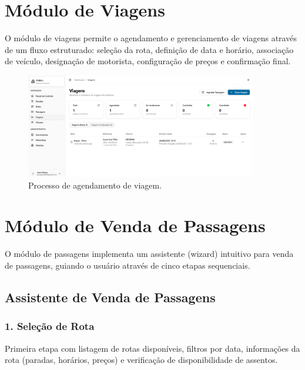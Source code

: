 \section{Módulo de Viagens}

O módulo de viagens permite o agendamento e gerenciamento de viagens através de um fluxo estruturado: seleção da rota, definição de data e horário, associação de veículo, designação de motorista, configuração de preços e confirmação final.

\begin{figure}[H]
  \centering
  \includegraphics[width=0.9\textwidth]{imagens/agendamento-viagem.png}
  \caption{Processo de agendamento de viagem.}
  \label{fig:agendamento-viagem}
\end{figure}

\section{Módulo de Venda de Passagens}

O módulo de passagens implementa um assistente (wizard) intuitivo para venda de passagens, guiando o usuário através de cinco etapas sequenciais.

\subsection{Assistente de Venda de Passagens}

\subsubsection{1. Seleção de Rota}

Primeira etapa com listagem de rotas disponíveis, filtros por data, informações da rota (paradas, horários, preços) e verificação de disponibilidade de assentos.

